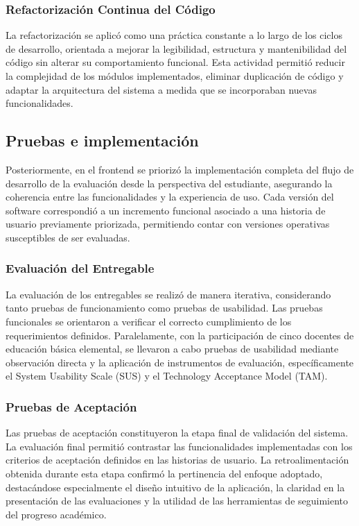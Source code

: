 \subsubsection*{Refactorización Continua del Código}

La refactorización se aplicó como una práctica constante a lo largo de los ciclos de desarrollo, orientada a mejorar la legibilidad, estructura y mantenibilidad del código sin alterar su comportamiento funcional. Esta actividad permitió reducir la complejidad de los módulos implementados, eliminar duplicación de código y adaptar la arquitectura del sistema a medida que se incorporaban nuevas funcionalidades.

\subsection{Pruebas e implementación}

Posteriormente, en el frontend se priorizó la implementación completa del flujo de desarrollo de la evaluación desde la perspectiva del estudiante, asegurando la coherencia entre las funcionalidades y la experiencia de uso. Cada versión del software correspondió a un incremento funcional asociado a una historia de usuario previamente priorizada, permitiendo contar con versiones operativas susceptibles de ser evaluadas.

\subsubsection*{Evaluación del Entregable}

La evaluación de los entregables se realizó de manera iterativa, considerando tanto pruebas de funcionamiento como pruebas de usabilidad. Las pruebas funcionales se orientaron a verificar el correcto cumplimiento de los requerimientos definidos. Paralelamente, con la participación de cinco docentes de educación básica elemental, se llevaron a cabo pruebas de usabilidad mediante observación directa y la aplicación de instrumentos de evaluación, específicamente el System Usability Scale (SUS) y el Technology Acceptance Model (TAM).

\subsubsection*{Pruebas de Aceptación}

Las pruebas de aceptación constituyeron la etapa final de validación del sistema. La evaluación final permitió contrastar las funcionalidades implementadas con los criterios de aceptación definidos en las historias de usuario. La retroalimentación obtenida durante esta etapa confirmó la pertinencia del enfoque adoptado, destacándose especialmente el diseño intuitivo de la aplicación, la claridad en la presentación de las evaluaciones y la utilidad de las herramientas de seguimiento del progreso académico.

